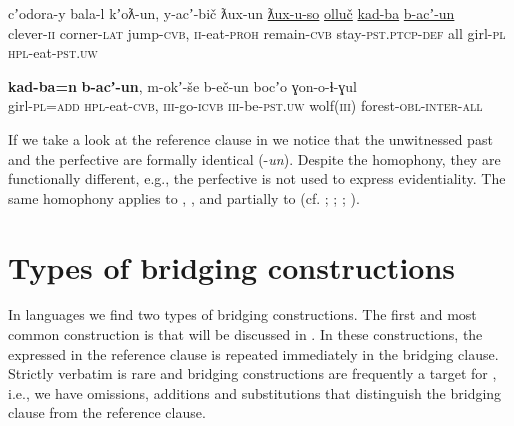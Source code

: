 \documentclass[output=paper]{LSP/langsci}
\begin{document}
\begin{exe}
	\ex	\label{ex:5ab}
	\begin{xlist}
		\ex	\label{ex:5a}
		\gll	 cʼodora-y   	bala-l    	kʼoƛ-un, 		y-acʼ-bič 		ƛux-un \underline{ƛux-u-so} 				\underline{olluč}      	\underline{kad-ba}   \underline{b-acʼ-un}\\
			clever-\textsc{ii} 	corner-\textsc{lat}  	jump-\textsc{cvb},	\textsc{ii}-eat-\textsc{proh}  	remain-\textsc{cvb} stay-\textsc{pst.ptcp-def}		all 			girl-\textsc{pl}   	\textsc{hpl}-eat-\textsc{pst.uw}   \\
		\glt	{}

		\ex	\label{ex:5b}
		\gll	\textbf{kad-ba=n}    	\textbf{b-acʼ-un}, 		m-okʼ-še 		b-eč-un bocʼo 	ɣon-o-ɬ-ɣul \\
			girl-\textsc{pl=add}  	\textsc{hpl}-eat-\textsc{cvb}, 	\textsc{iii}-go-\textsc{icvb}	\textsc{iii}-be-\textsc{pst.uw} wolf(\textsc{iii})   	forest-\textsc{obl-inter-all} \\
		\glt	{}
	\end{xlist}
\end{exe}


If we take a look at the reference clause in  we notice that the unwitnessed past and the perfective  are formally identical (-\textit{un}). Despite the homopho\-ny, they are functionally different, e.g., the perfective  is not used to express evidentiality. The same homophony applies to , , and partially to  (cf. \citealt[244]{Forker.2013a}; \citealt[391]{Khalilova.2009}; \citealt{Khalilova.2011}; \citealt{Comrie.et.al.2016}). 



\section{Types of bridging constructions}
\label{sec:Types of bridging constructions}
In  languages we find two types of bridging constructions. The first and most common construction is  that will be discussed in . In these constructions, the  expressed in the reference clause is repeated immediately in the bridging clause. Strictly verbatim  is rare  and bridging constructions are frequently a target for , i.e., we have omissions, additions and substitutions that distinguish the bridging clause from the reference clause. 
\end{document}
